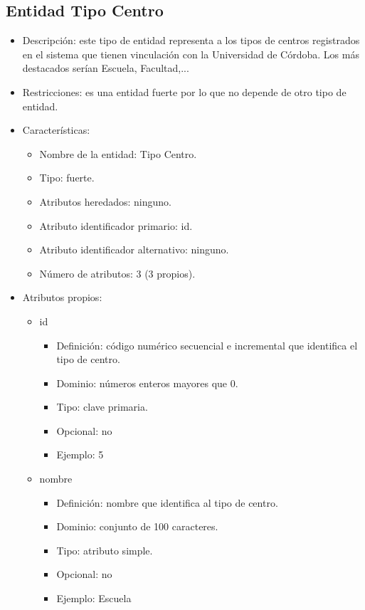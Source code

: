 \subsection{Entidad Tipo Centro}
\begin{itemize}
    \item Descripción: este tipo de entidad representa a los tipos de centros registrados en el sistema que tienen vinculación con la Universidad de Córdoba. Los más destacados serían Escuela, Facultad,...
    \item Restricciones: es una entidad fuerte por lo que no depende de otro tipo de entidad.
    \item Características:
    \begin{itemize}
        \item Nombre de la entidad: Tipo Centro.
        \item Tipo: fuerte.
        \item Atributos heredados: ninguno.
        \item Atributo identificador primario: id.
        \item Atributo identificador alternativo: ninguno.
        \item Número de atributos: 3 (3 propios).
    \end{itemize}

    \item Atributos propios:
    \begin{itemize}
        \item id
        \begin{itemize}
            \item Definición: código numérico secuencial e incremental que identifica el tipo de centro.
            \item Dominio: números enteros mayores que 0.
            \item Tipo: clave primaria.
            \item Opcional: no
            \item Ejemplo: 5
        \end{itemize}

        \item nombre
        \begin{itemize}
            \item Definición: nombre que identifica al tipo de centro.
            \item Dominio: conjunto de 100 caracteres.
            \item Tipo: atributo simple.
            \item Opcional: no
            \item Ejemplo: Escuela
        \end{itemize}


\end{itemize}
\end{itemize}
